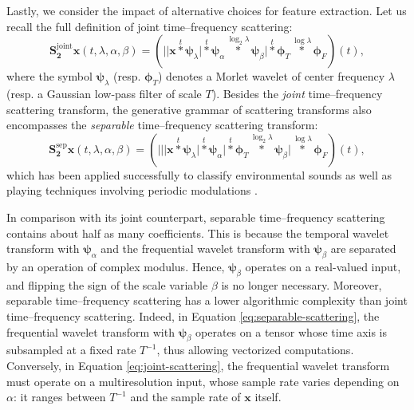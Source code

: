 \documentclass{bmcart}
\begin{document}
Lastly, we consider the impact of alternative choices for feature extraction.
Let us recall the full definition of joint time--frequency scattering:
\begin{equation}
\mathbf{S_2^{\mathrm{joint}}}\boldsymbol{x}(t,\lambda,\alpha,\beta) = 
\left(
\Big\vert
\big\vert
\boldsymbol{x} \overset{t}{\ast} \boldsymbol{\psi}_{\lambda}
\big\vert
\overset{t}{\ast}
\boldsymbol{\psi}_{\alpha}
\overset{\log_2 \lambda}{\ast}
\boldsymbol{\psi}_{\beta}
\Big\vert
\overset{t}{\ast} \boldsymbol{\phi}_{T}
\overset{\log \lambda}{\ast} \boldsymbol{\phi}_{F}\right)(t),
\label{eq:joint-scattering}
\end{equation}
where the symbol $\boldsymbol{\psi}_{\lambda}$ (resp. $\boldsymbol{\phi}_T$) denotes a Morlet wavelet of center frequency $\lambda$ (resp. a Gaussian low-pass filter of scale $T$).
Besides the \emph{joint} time--frequency scattering transform, the generative grammar of scattering transforms \cite{lostanlen2019chapter} also encompasses the \emph{separable} time--frequency scattering transform:
\begin{equation}
\mathbf{S_2^{\mathrm{sep}}}\boldsymbol{x}(t,\lambda,\alpha,\beta) = 
\left(
\bigg\vert
\Big\vert
\big\vert
\boldsymbol{x} \overset{t}{\ast} \boldsymbol{\psi}_{\lambda}
\big\vert
\overset{t}{\ast}
\boldsymbol{\psi}_{\alpha}
\Big\vert
\overset{t}{\ast} \boldsymbol{\phi}_{T}
\overset{\log_2 \lambda}{\ast}
\boldsymbol{\psi}_{\beta}
\bigg\vert
\overset{\log \lambda}{\ast} \boldsymbol{\phi}_{F}
\right)(t),
\label{eq:separable-scattering}
\end{equation}
which has been applied successfully to classify environmental sounds \cite{bauge2013icassp} as well as playing techniques involving periodic modulations \cite{wang2019ismir}.

In comparison with its joint counterpart, separable time--frequency scattering contains about half as many coefficients.
This is because the temporal wavelet transform with $\boldsymbol{\psi}_\alpha$ and the frequential wavelet transform with $\boldsymbol{\psi}_\beta$ are separated by an operation of complex modulus.
Hence, $\boldsymbol{\psi}_\beta$ operates on a real-valued input, and flipping the sign of the scale variable $\beta$ is no longer necessary.
Moreover, separable time--frequency scattering has a lower algorithmic complexity than joint time--frequency scattering.
Indeed, in Equation \ref{eq:separable-scattering}, the frequential wavelet transform with $\boldsymbol{\psi}_{\beta}$ operates on a tensor whose time axis is subsampled at a fixed rate $T^{-1}$, thus allowing vectorized computations.
Conversely, in Equation \ref{eq:joint-scattering}, the frequential wavelet transform must operate on a multiresolution input, whose sample rate varies  depending on $\alpha$: it ranges between $T^{-1}$ and the sample rate of $\boldsymbol{x}$ itself.
\end{document}
